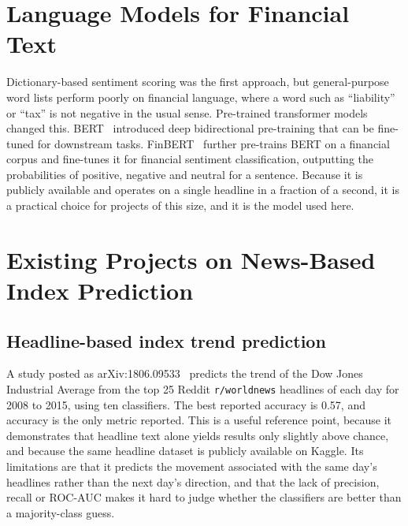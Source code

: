 \section{Language Models for Financial Text}
Dictionary-based sentiment scoring was the first approach, but general-purpose word lists perform poorly on financial language, where a word such as ``liability'' or ``tax'' is not negative in the usual sense. Pre-trained transformer models changed this. BERT~\cite{devlin2019bert} introduced deep bidirectional pre-training that can be fine-tuned for downstream tasks. FinBERT~\cite{araci2019finbert} further pre-trains BERT on a financial corpus and fine-tunes it for financial sentiment classification, outputting the probabilities of positive, negative and neutral for a sentence. Because it is publicly available and operates on a single headline in a fraction of a second, it is a practical choice for projects of this size, and it is the model used here.

\section{Existing Projects on News-Based Index Prediction}

\subsection{Headline-based index trend prediction}
A study posted as arXiv:1806.09533~\cite{nlpheadlines2018} predicts the trend of the Dow Jones Industrial Average from the top 25 Reddit \texttt{r/worldnews} headlines of each day for 2008 to 2015, using ten classifiers. The best reported accuracy is 0.57, and accuracy is the only metric reported. This is a useful reference point, because it demonstrates that headline text alone yields results only slightly above chance, and because the same headline dataset is publicly available on Kaggle. Its limitations are that it predicts the movement associated with the same day's headlines rather than the next day's direction, and that the lack of precision, recall or ROC-AUC makes it hard to judge whether the classifiers are better than a majority-class guess.


